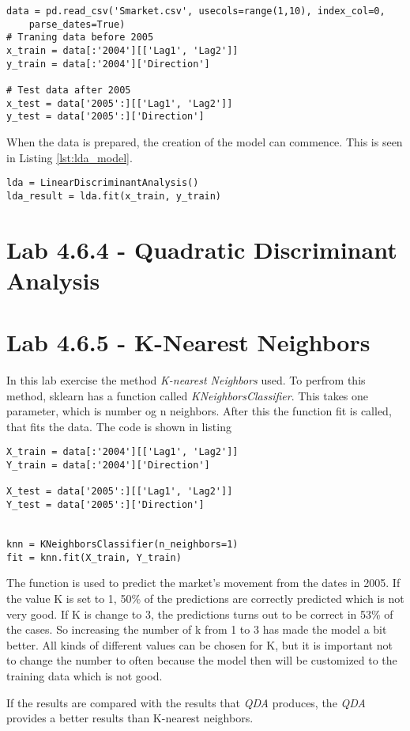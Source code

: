 \begin{lstlisting}[caption={Preparation of data for LDA fitting}, label=lst:lda_data, mathescape=true]
data = pd.read_csv('Smarket.csv', usecols=range(1,10), index_col=0, 
	parse_dates=True)
# Traning data before 2005
x_train = data[:'2004'][['Lag1', 'Lag2']]
y_train = data[:'2004']['Direction']

# Test data after 2005
x_test = data['2005':][['Lag1', 'Lag2']]
y_test = data['2005':]['Direction']
\end{lstlisting}

When the data is prepared, the creation of the model can commence. This is seen in Listing \ref{lst:lda_model}.

\begin{lstlisting}[caption={Creation of LDA model}, label=lst:lda_model, mathescape=true]
lda = LinearDiscriminantAnalysis()
lda_result = lda.fit(x_train, y_train)
\end{lstlisting}


\section{Lab 4.6.4 - Quadratic Discriminant Analysis}
\section{Lab 4.6.5 - K-Nearest Neighbors}

In this lab exercise the method \emph{K-nearest Neighbors} used. To perfrom this method, sklearn has a function called \emph{KNeighborsClassifier}. This takes one parameter, which is number og n neighbors. After this the function fit is called, that fits the data.
The code is shown in listing

\begin{lstlisting}[caption={Python K-Nearest neighbors function, where K is set to 1}, label=lst:kneighbor, mathescape=true]
X_train = data[:'2004'][['Lag1', 'Lag2']]
Y_train = data[:'2004']['Direction']

X_test = data['2005':][['Lag1', 'Lag2']]
Y_test = data['2005':]['Direction']


knn = KNeighborsClassifier(n_neighbors=1)
fit = knn.fit(X_train, Y_train)
\end{lstlisting}

The function is used to predict the market's movement from the dates in 2005. If the value K is set to 1, 50\% of the predictions are correctly predicted which is not very good.
If K is change to 3, the predictions turns out to be correct in 53\% of the cases. So increasing the number of k from 1 to 3 has made the model a bit better. All kinds of different values can be chosen for K, but it is important not to change the number to often because the model then will be customized to the training data which is not good.

If the results are compared with the results that \emph{QDA} produces, the \emph{QDA} provides a better results than K-nearest neighbors.